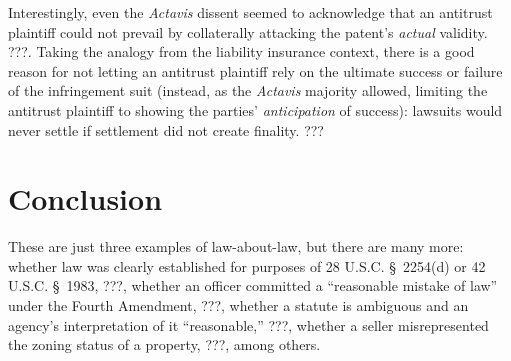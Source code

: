 \documentclass[
  12pt,
  letterpaper,
]{scrartcl}
\begin{document}
Interestingly, even the \textit{Actavis} dissent seemed to acknowledge that an
antitrust plaintiff could not prevail by collaterally attacking the patent's
\textit{actual} validity. ???. Taking the analogy from the liability insurance
context, there is a good reason for not letting an antitrust plaintiff rely on
the ultimate success or failure of the infringement suit (instead, as the
\textit{Actavis} majority allowed, limiting the antitrust plaintiff to showing
the parties' \textit{anticipation} of success): lawsuits would never settle if
settlement did not create finality. ???


\section{Conclusion}

These are just three examples of law-about-law, but there are many more:
whether law was clearly established for purposes of 28 U.S.C. § 2254(d) or 42
U.S.C. § 1983, ???, whether an officer committed a ``reasonable mistake of
law'' under the Fourth Amendment, ???, whether a statute is ambiguous and an
agency's interpretation of it ``reasonable,'' ???, whether a seller
misrepresented the zoning status of a property, ???, among others.
\end{document}
